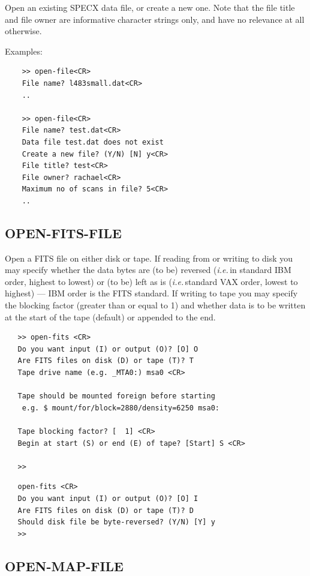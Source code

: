 \documentclass[11pt,twoside]{report}
\newcommand{\ie}{{\it i.e.\,}}
\begin{document}
Open an existing SPECX data file, or create a new one. Note that the
file title and file owner are informative character strings only, and
have no relevance at all otherwise.

Examples:
\begin{verbatim}
    >> open-file<CR>
    File name? l483small.dat<CR>
    ..

    >> open-file<CR>
    File name? test.dat<CR>
    Data file test.dat does not exist
    Create a new file? (Y/N) [N] y<CR>
    File title? test<CR>
    File owner? rachael<CR>
    Maximum no of scans in file? 5<CR>
    ..
\end{verbatim}

\subsection{OPEN-FITS-FILE} 

Open a FITS file on either disk or tape. If reading from or writing to disk you may
specify whether the data bytes are (to be) reversed (\ie in standard
IBM order, highest to lowest) or (to be) left as is (\ie standard VAX order,
lowest to highest) --- IBM order is the FITS standard. If writing to tape
you may specify the blocking factor (greater than or equal to 1) and whether
data is to be written at the start of the tape (default) or appended to the
end.

\begin{verbatim}
   >> open-fits <CR>
   Do you want input (I) or output (O)? [O] O
   Are FITS files on disk (D) or tape (T)? T
   Tape drive name (e.g. _MTA0:) msa0 <CR>
 
   Tape should be mounted foreign before starting
    e.g. $ mount/for/block=2880/density=6250 msa0:
 
   Tape blocking factor? [  1] <CR>
   Begin at start (S) or end (E) of tape? [Start] S <CR>

   >> 
\end{verbatim}

\begin{verbatim}
   open-fits <CR>
   Do you want input (I) or output (O)? [O] I
   Are FITS files on disk (D) or tape (T)? D
   Should disk file be byte-reversed? (Y/N) [Y] y
   >> 
\end{verbatim}

\subsection{OPEN-MAP-FILE} 
\end{document}
